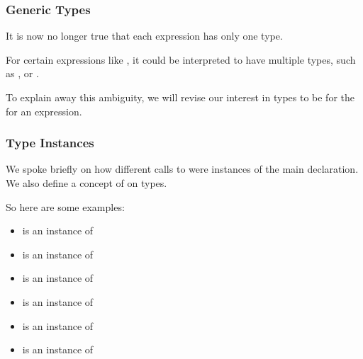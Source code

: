 \documentclass[aspectratio=169, handout]{beamer}
\begin{document}
\begin{frame}[fragile]
  \frametitle{Generic Types}

  It is now no longer true that each expression has only one type.

  \pause
  \vspace{\fill}

  For certain expressions like , it could be
  interpreted to have multiple types, such as , or .

  \pause
  \vspace{\fill}

  To explain away this ambiguity, we will revise our interest in types to be
  for the  for an expression.

  \pause
  \vspace{\fill}

\end{frame}

\begin{frame}[fragile]
  \frametitle{Type Instances}

  We spoke briefly on how different calls to  were instances of
  the main declaration. We also define a concept of  on types.

  \pause
  \vspace{\fill}


  \pause
  \vspace{\fill}

  So here are some examples:
  \begin{itemize}
    \item {} is an instance of 
    \item {} is an instance of 
    \item {} is an instance of 
    \item {} is an instance of 
    \item {} is an instance of 
    \item {} is an instance of 
  \end{itemize}
\end{frame}
\end{document}
